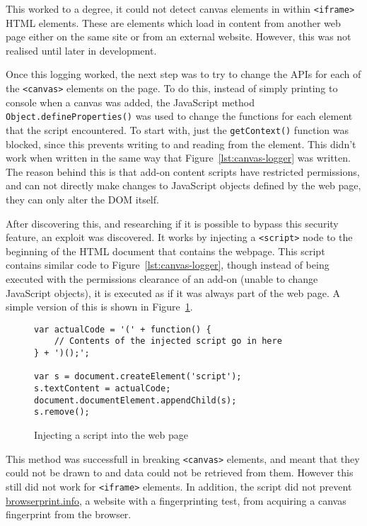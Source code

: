This worked to a degree, it could not detect canvas elements in within \texttt{<iframe>} HTML elements.
These are elements which load in content from another web page either on the same site or from an external website.
However, this was not realised until later in development.

Once this logging worked, the next step was to try to change the APIs for each of the \texttt{<canvas>} elements on the page.
To do this, instead of simply printing to console when a canvas was added, the JavaScript method \texttt{Object.defineProperties()} was used to change the functions for each element that the script encountered.
To start with, just the \texttt{getContext()} function was blocked, since this prevents writing to and reading from the element.
This didn't work when written in the same way that Figure~\ref{lst:canvas-logger} was written.
The reason behind this is that add-on content scripts have restricted permissions, and can not directly make changes to JavaScript objects defined by the web page, they can only alter the DOM itself.

After discovering this, and researching if it is possible to bypass this security feature, an exploit was discovered.
It works by injecting a \texttt{<script>} node to the beginning of the HTML document that contains the webpage.
This script contains similar code to Figure~\ref{lst:canvas-logger}, though instead of being executed with the permissions clearance of an add-on (unable to change JavaScript objects), it is executed as if it was always part of the web page.
A simple version of this is shown in Figure~\ref{lst:injection}.

\begin{figure}[h!]
\begin{lstlisting}
var actualCode = '(' + function() {
    // Contents of the injected script go in here
} + ')();';

var s = document.createElement('script');
s.textContent = actualCode;
document.documentElement.appendChild(s);
s.remove();
\end{lstlisting}
\caption{Injecting a script into the web page}
\label{lst:injection}
\end{figure}

This method was successfull in breaking \texttt{<canvas>} elements, and meant that they could not be drawn to and data could not be retrieved from them.
However this still did not work for \texttt{<iframe>} elements.
In addition, the script did not prevent \url{browserprint.info}, a website with a fingerprinting test, from acquiring a canvas fingerprint from the browser.

